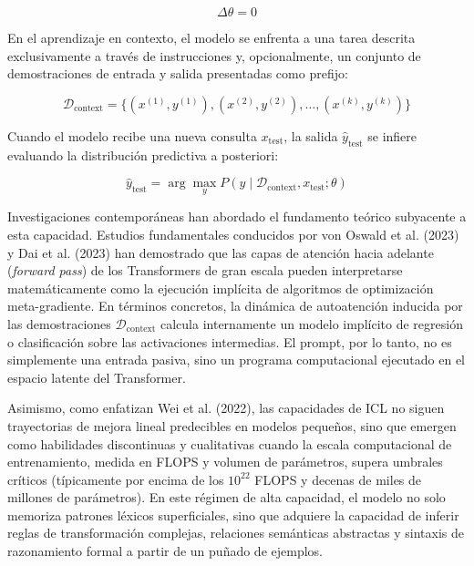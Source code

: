 \begin{equation}
\Delta \theta = 0
\end{equation}

En el aprendizaje en contexto, el modelo se enfrenta a una tarea descrita exclusivamente a través de instrucciones y, opcionalmente, un conjunto de demostraciones de entrada y salida presentadas como prefijo:

\begin{equation}
\mathcal{D}_{\mathrm{context}} = \{(x^{(1)}, y^{(1)}), (x^{(2)}, y^{(2)}), \dots, (x^{(k)}, y^{(k)})\}
\end{equation}

Cuando el modelo recibe una nueva consulta $x_{\mathrm{test}}$, la salida $\hat{y}_{\mathrm{test}}$ se infiere evaluando la distribución predictiva a posteriori:

\begin{equation}
\hat{y}_{\mathrm{test}} = \arg\max_y P(y \mid \mathcal{D}_{\mathrm{context}}, x_{\mathrm{test}}; \theta)
\end{equation}

Investigaciones contemporáneas han abordado el fundamento teórico subyacente a esta capacidad. Estudios fundamentales conducidos por von Oswald et al. (2023) y Dai et al. (2023) han demostrado que las capas de atención hacia adelante (\textit{forward pass}) de los Transformers de gran escala pueden interpretarse matemáticamente como la ejecución implícita de algoritmos de optimización meta-gradiente. En términos concretos, la dinámica de autoatención inducida por las demostraciones $\mathcal{D}_{\mathrm{context}}$ calcula internamente un modelo implícito de regresión o clasificación sobre las activaciones intermedias. El prompt, por lo tanto, no es simplemente una entrada pasiva, sino un programa computacional ejecutado en el espacio latente del Transformer.

Asimismo, como enfatizan Wei et al. (2022), las capacidades de ICL no siguen trayectorias de mejora lineal predecibles en modelos pequeños, sino que emergen como habilidades discontinuas y cualitativas cuando la escala computacional de entrenamiento, medida en FLOPS y volumen de parámetros, supera umbrales críticos (típicamente por encima de los $10^{22}$ FLOPS y decenas de miles de millones de parámetros). En este régimen de alta capacidad, el modelo no solo memoriza patrones léxicos superficiales, sino que adquiere la capacidad de inferir reglas de transformación complejas, relaciones semánticas abstractas y sintaxis de razonamiento formal a partir de un puñado de ejemplos.

